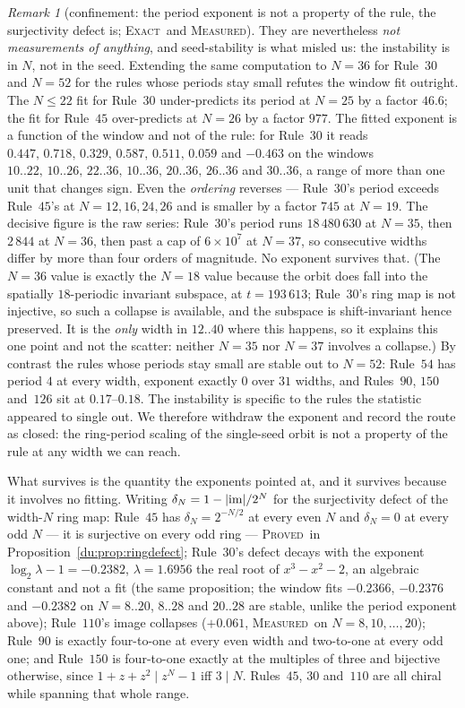 \documentclass[11pt]{article}
\theoremstyle{definition}
\theoremstyle{remark}
\newtheorem{remark}[theorem]{Remark}
\newcommand{\PROVED}{\textsc{Proved}}
\newcommand{\EXACT}{\textsc{Exact}}
\newcommand{\MEASURED}{\textsc{Measured}}
\begin{document}
\begin{remark}[confinement: the period exponent is not a property of the rule, the surjectivity defect is; \EXACT\ and \MEASURED]
They are nevertheless \emph{not measurements of anything}, and seed-stability is what misled us: the
instability is in $N$, not in the seed. Extending the same computation to $N=36$ for Rule~30 and $N=52$
for the rules whose periods stay small refutes the window fit outright. The $N\le22$ fit for Rule~30
under-predicts its period at $N=25$ by a factor $46.6$; the fit for Rule~$45$ over-predicts at $N=26$ by
a factor $977$. The fitted exponent is a function of the window and not of the rule: for Rule~30 it
reads $0.447,\,0.718,\,0.329,\,0.587,\,0.511,\,0.059$ and $-0.463$ on the windows
$10..22,\,10..26,\,22..36,\,10..36,\,20..36,\,26..36$ and $30..36$, a range of more than one unit that
changes sign. Even the \emph{ordering} reverses --- Rule~30's period exceeds Rule~$45$'s at
$N=12,16,24,26$ and is smaller by a factor $745$ at $N=19$. The decisive figure is the raw series: Rule~30's
period runs $18\,480\,630$ at $N=35$, then $2\,844$ at $N=36$, then past a cap of $6\times10^{7}$ at
$N=37$, so consecutive widths differ by more than four orders of magnitude. No exponent survives that.
(The $N=36$ value is exactly the $N=18$ value because the orbit does fall into the
spatially $18$-periodic invariant subspace, at $t=193\,613$; Rule~30's ring map is not injective, so such
a collapse is available, and the subspace is shift-invariant hence preserved. It is the \emph{only}
width in $12..40$ where this happens, so it explains this one point and not the scatter: neither $N=35$
nor $N=37$ involves a collapse.) By contrast the rules whose periods
stay small are stable out to $N=52$: Rule~$54$ has period $4$ at every width, exponent exactly $0$ over
$31$ widths, and Rules~$90$, $150$ and~$126$ sit at $0.17$--$0.18$. The instability is specific to the
rules the statistic appeared to single out. We therefore withdraw the exponent and record the route as closed: the ring-period scaling of the
single-seed orbit is not a property of the rule at any width we can reach.

What survives is the quantity the exponents pointed at, and it survives because it involves no fitting.
Writing $\delta_N=1-|{\rm im}|/2^N$ for the surjectivity defect of the width-$N$ ring map: Rule~$45$ has
$\delta_N=2^{-N/2}$ at every even $N$ and $\delta_N=0$ at every odd $N$ --- it is surjective on every odd
ring --- \PROVED\ in Proposition~\ref{du:prop:ringdefect}; Rule~30's defect decays with the exponent
$\log_2\lambda-1=-0.2382$, $\lambda=1.6956$ the real root of $x^{3}-x^{2}-2$, an algebraic constant and
not a fit (the same proposition; the window fits $-0.2366$, $-0.2376$ and $-0.2382$ on $N=8..20$,
$8..28$ and $20..28$ are stable, unlike the period exponent above); Rule~$110$'s image collapses
($+0.061$, \MEASURED\ on $N=8,10,\dots,20$); Rule~$90$ is exactly four-to-one at every even width and
two-to-one at every odd one; and Rule~$150$ is four-to-one exactly at the multiples of three and
bijective otherwise, since $1+z+z^2\mid z^N-1$ iff $3\mid N$. Rules~$45$, $30$ and~$110$ are all chiral
while spanning that whole range.


\end{remark}
\end{document}
